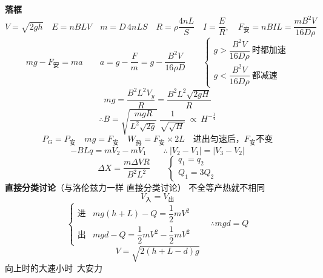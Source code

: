 \textbf{落框}
\[ V=\sqrt{2gh}\quad E=nBLV\quad m=D\,4nLS\quad R=\rho\frac{4nL}{S}\quad I=\frac{E}{R},\quad F_{\text{安}}=nBIL=\frac{mB^2V}{16D\rho} \]
\[ mg-F_{\text{安}}=ma\qquad a=g-\frac{F}{m}=g-\frac{B^2V}{16\rho D}\qquad \left\{\begin{array}{l} g>\dfrac{B^2V}{16D\rho}\ \text{时都加速}\\[2ex] g<\dfrac{B^2V}{16D\rho}\ \text{都减速}\end{array}\right. \] %
\[ mg=\frac{B^2L^2V_y}{R}=\frac{B^2L^2\sqrt{2gH}}{R} \]
\[ \therefore B=\sqrt{\frac{mgR}{L^2\sqrt{2g}}}\ \frac{1}{\sqrt{\sqrt{H}}}\ \propto\ H^{-\frac{1}{4}} \]
\[ P_G=P_{\text{安}}\quad mg=F_{\text{安}}\quad W_{\text{热}}=F_{\text{安}}\times 2L\quad \text{进出匀速后，}F_{\text{安}}\text{不变} \]
\[ -BLq=mV_2-mV_1\qquad \therefore\ |V_2-V_1|=|V_3-V_2| \]
\[ \Delta X=\frac{m\Delta VR}{B^2L^2}\qquad \left\{\begin{array}{l} q_1=q_2\\ Q_1=3Q_2\end{array}\right. \]
\textbf{直接分类讨论}（与洛伦兹力一样 直接分类讨论） %
不全等产热就不相同
\[ V_{\text{入}}=V_{\text{出}} \]
\[ \left\{\begin{array}{ll}\text{进} & mg(h+L)-Q=\dfrac{1}{2}mV^2\\[2ex] \text{出} & mgd-Q=\dfrac{1}{2}mV^2-\dfrac{1}{2}mV^2\end{array}\right.\qquad \therefore mgd=Q \]
\[ V=\sqrt{2(h+L-d)g} \]
向上时的大速小时\ 大安力


